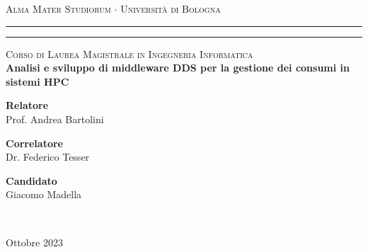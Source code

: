 
\begin{titlepage}
	\begin{center}
		{{\Large{\textsc{Alma Mater Studiorum $\cdot$ Universit\`a di
		Bologna}}}} \rule[0.1cm]{14cm}{0.1mm}
		\rule[0.5cm]{14cm}{0.6mm}
			\large{\textsc{Corso di Laurea Magistrale in Ingegneria Informatica}}
			\\[1.8cm]
			\LARGE
			{\bfseries Analisi e sviluppo di middleware DDS per la gestione dei consumi in sistemi HPC}\\[1.2cm]
	\end{center}
	\vspace{3.0cm}
	\vfill
	\begin{minipage}{0.39\textwidth}
		{\bfseries Relatore}\\
		Prof. Andrea Bartolini

		{\bfseries Correlatore}\\
		Dr. Federico Tesser  
	\end{minipage}
	\hfill
	\vspace{2cm}
	\begin{minipage}{0.39\textwidth}
		\begin{flushright} {\bfseries Candidato}\\
		Giacomo Madella \end{flushright} 
	\end{minipage} \\
\begin{center}
	Ottobre 2023
\end{center}

\end{titlepage}




